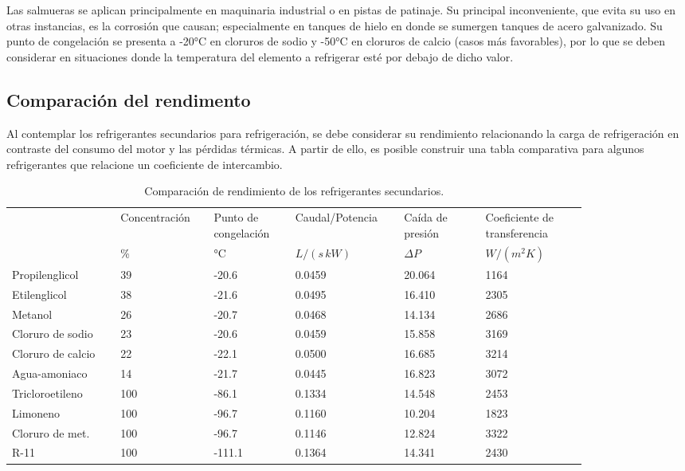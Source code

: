 	Las salmueras se aplican principalmente en maquinaria industrial o en pistas de patinaje. Su principal inconveniente, que evita su uso en otras instancias, es la corrosión que causan; especialmente en tanques de hielo en donde se sumergen tanques de acero galvanizado. Su punto de congelación se presenta a -20°C en cloruros de sodio y -50°C en cloruros de calcio (casos más favorables), por lo que se deben considerar en situaciones donde la temperatura del elemento a refrigerar esté por debajo de dicho valor.

	\subsection{Comparación del rendimento}

	Al contemplar los refrigerantes secundarios para refrigeración, se debe considerar su rendimiento relacionando la carga de refrigeración en contraste del consumo del motor y las pérdidas térmicas. A partir de ello, es posible construir una tabla comparativa para algunos refrigerantes que relacione un coeficiente de intercambio.
	
	\begin{table}[H]
		\centering
		\caption{Comparación de rendimiento de los refrigerantes secundarios.}
		\footnotesize
		\begin{tabular}{M{0.16\linewidth} C{0.125\linewidth} C{0.125\linewidth} C{0.15\linewidth} C{0.125\linewidth} C{0.15\linewidth}}
			 & Concentración  & Punto de congelación & Caudal/Potencia  & Caída de presión  & Coeficiente de transferencia  \\
			 &  \% &  °C &  $L/(s\, kW)$ &  $\Delta P$ & $W/(m^2 K)$ \\
			
			\hline
			Propilenglicol      	& 39  & -20.6  & 0.0459 & 20.064 & 1164 \\
			Etilenglicol      		& 38  & -21.6  & 0.0495 & 16.410 & 2305 \\
			Metanol           		& 26  & -20.7  & 0.0468 & 14.134 & 2686 \\
			Cloruro de sodio      	& 23  & -20.6  & 0.0459 & 15.858 & 3169 \\
			Cloruro de calcio      	& 22  & -22.1  & 0.0500 & 16.685 & 3214 \\
			Agua-amoniaco   	  	& 14  & -21.7  & 0.0445 & 16.823 & 3072 \\
			Tricloroetileno     	& 100 & -86.1  & 0.1334 & 14.548 & 2453 \\
			Limoneno           	  	& 100 & -96.7  & 0.1160 & 10.204 & 1823 \\
			Cloruro de met.     	& 100 & -96.7  & 0.1146 & 12.824 & 3322 \\
			R-11                   	& 100 & -111.1 & 0.1364 & 14.341 & 2430 \\
			\hline
		\end{tabular}
	\end{table}


\newpage
\pagestyle{empty}